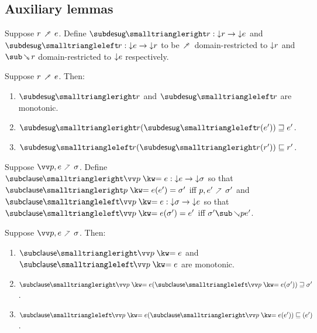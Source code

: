 \subsection{Auxiliary lemmas}

\begin{definition}
   Suppose $r \desugarFwdR e$. Define $\listRestFwdF{r}: \Below{r} \to \Below{e}$ and $\listRestBwdF{r}: \Below{e} \to \Below{r}$ to be $\desugarFwdR$ domain-restricted to ${\downarrow}{r}$ and $\desugarBwdR{r}$ domain-restricted to ${\downarrow}{e}$ respectively.
\end{definition}

\begin{lemma}
  \label{lem:aux:desugarlistrest:gc}
  Suppose $r \desugarFwdR e$. Then:
  \begin{enumerate}
     \item \label{lem:aux:desugarlistrest:gc:1} $\listRestFwdF{r}$ and $\listRestBwdF{r}$ are monotonic.
     \item \label{lem:aux:desugarlistrest:gc:2} $\listRestFwdF{r}(\listRestBwdF{r}(e')) \geq e'$.
     \item \label{lem:aux:desugarlistrest:gc:3} $\listRestBwdF{r}(\listRestFwdF{r}(r')) \leq r'$.
  \end{enumerate}
\end{lemma}

\begin{definition}
   Suppose $\vec{p}, e \clauseFwdR \sigma$. Define $\clauseFwdF{\clause{\vec{p}}{e}}: \Below{e} \to \Below{\sigma}$ so that $\clauseFwdF{\clause{p}{e}}(e') = \sigma'$ iff $p, e' \clauseFwdR \sigma'$ and $\clauseBwdF{\clause{\vec{p}}{e}}: \Below{\sigma} \to \Below{e}$ so that $\clauseBwdF{\clause{\vec{p}}{e}}(\sigma') = e'$ iff $\sigma' \clauseBwdR{p} e'$.
\end{definition}

\begin{lemma}
  \label{lem:aux:clause:gc}
  Suppose $\vec{p}, e \clauseFwdR \sigma$. Then:
  \begin{enumerate}
     \item \label{lem:aux:clause:gc:1} $\clauseFwdF{\clause{\vec{p}}{e}}$ and $\clauseBwdF{\clause{\vec{p}}{e}}$ are monotonic.
     \item \label{lem:aux:clause:gc:2} $\clauseFwdF{\clause{\vec{p}}{e}}(\clauseBwdF{\clause{\vec{p}}{e}}(\sigma')) \geq \sigma'$.
     \item \label{lem:aux:clause:gc:3} $\clauseBwdF{\clause{\vec{p}}{e}}(\clauseFwdF{\clause{\vec{p}}{e}}(e')) \leq (e')$.
  \end{enumerate}
\end{lemma}

